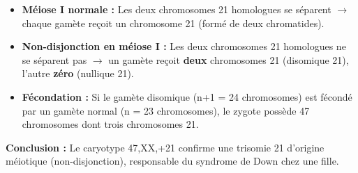 \documentclass[11pt]{article}
\begin{document}
\begin{exoresolu}
\begin{enumerate}
    \begin{itemize}
        \item \textbf{Méiose I normale :} Les deux chromosomes 21 homologues se séparent $\rightarrow$ chaque gamète reçoit un chromosome 21 (formé de deux chromatides).
        \item \textbf{Non-disjonction en méiose I :} Les deux chromosomes 21 homologues ne se séparent pas $\rightarrow$ un gamète reçoit \textbf{deux} chromosomes 21 (disomique 21), l'autre \textbf{zéro} (nullique 21).
        \item \textbf{Fécondation :} Si le gamète disomique (n+1 = 24 chromosomes) est fécondé par un gamète normal (n = 23 chromosomes), le zygote possède 47 chromosomes dont trois chromosomes 21.
    \end{itemize}
    \textbf{Conclusion :} Le caryotype 47,XX,+21 confirme une trisomie 21 d'origine méiotique (non-disjonction), responsable du syndrome de Down chez une fille.
\end{enumerate}
\end{exoresolu}
\end{document}

